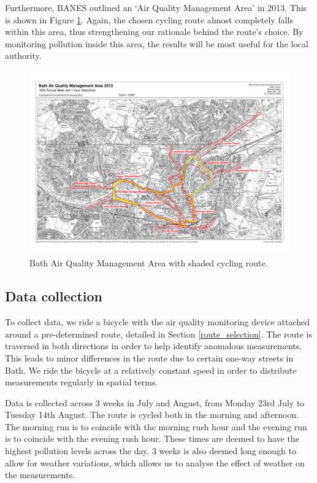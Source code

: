 \documentclass[11pt,twosided,a4paper]{report}
\begin{document}
Furthermore, BANES outlined an `Air Quality Management Area' in 2013. This is shown in Figure \ref{aqma}. Again, the chosen cycling route almost completely falls within this area, thus strengthening our rationale behind the route's choice. By monitoring pollution inside this area, the results will be most useful for the local authority.

\begin{figure}[!tb]
\centering
\includegraphics[width=1\textwidth]{shaded_route}
\caption[Bath Air Quality Management Area.]{Bath Air Quality Management Area \citep{BANES2017baqap} with shaded cycling route.}
\label{aqma}
\end{figure}

\subsection{Data collection} \label{data_collection:q1}

To collect data, we ride a bicycle with the air quality monitoring device attached around a pre-determined route, detailed in Section \ref{route_selection}. The route is traversed in both directions in order to help identify anomalous measurements. This leads to minor differences in the route due to certain one-way streets in Bath. We ride the bicycle at a relatively constant speed in order to distribute measurements regularly in spatial terms.

Data is collected across 3 weeks in July and August, from Monday 23rd July to Tuesday 14th August. The route is cycled both in the morning and afternoon. The morning run is to coincide with the morning rush hour and the evening run is to coincide with the evening rush hour. These times are deemed to have the highest pollution levels across the day. 3 weeks is also deemed long enough to allow for weather variations, which allows us to analyse the effect of weather on the measurements.
\end{document}
